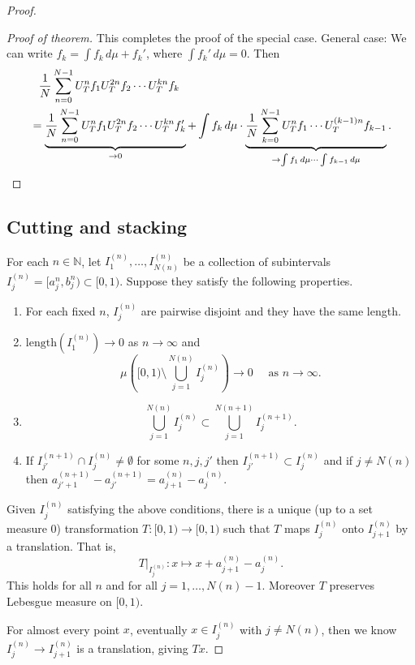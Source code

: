 \documentclass{article}
\begin{document}
\begin{proof}
\begin{proof}[Proof of theorem]
  This completes the proof of the special case.
  General case: We can write $f_k = \int f_k \, d\mu + f_k'$, where $\int f_k' \, d\mu = 0$.
  Then
  \begin{align*}
    &\phantom{=}\frac{1}{N} \sum_{n=0}^{N-1} U_T^n f_1 U_T^{2n} f_2 \dotsm U_T^{kn} f_k  \\
    &= \underbrace{\frac{1}{N} \sum_{n=0}^{N-1} U_T^n f_1 U_T^{2n} f_2 \dotsm U_T^{kn} f_k'}_{\to 0} + \int f_k \, d\mu \cdot \underbrace{\frac{1}{N} \sum_{k=0}^{N-1} U_T^n f_1 \dotsm U_T^{(k-1)n} f_{k-1}}_{\to \int f_1 \, d\mu \dotsm \int f_{k-1} \, d\mu}. \qedhere
  \end{align*}
\end{proof}

\subsection{Cutting and stacking}
For each $n \in \mathbb{N}$, let $I_1^{(n)}, \dotsc, I_{N(n)}^{(n)}$ be a collection of subintervals $I_j^{(n)} = [a_j^{n}, b_j^{n}) \subset [0,1)$. %
Suppose they satisfy the following properties.
\begin{enumerate}[label=(\arabic*)]
  \item For each fixed $n$, $I_j^{(n)}$ are pairwise disjoint and they have the same length.
  \item $\text{length}(I_1^{(n)}) \to 0$ as $n \to \infty$ and
    \begin{equation*}
        \mu\left([0,1) \setminus \bigcup_{j=1}^{N(n)} I_j^{(n)}\right) \to 0 \quad \text{ as } n \to \infty.
    \end{equation*}
  \item
    \begin{equation*}\bigcup_{j = 1}^{N(n)} I_j^{(n)} \subset \bigcup_{j=1}^{N(n+1)} I_j^{(n+1)}.\end{equation*}
  \item If $I_{j'}^{(n+1)} \cap I_j^{(n)} \neq \emptyset$ for some $n,j,j'$ then $I_{j'}^{(n+1)} \subset I_j^{(n)}$ and if $j \neq N(n)$ then $a_{j'+1}^{(n+1)} - a_{j'}^{(n+1)} = a_{j+1}^{(n)} - a_j^{(n)}$.
\end{enumerate}
\begin{lemma}
  Given $I_j^{(n)}$ satisfying the above conditions, there is a unique (up to a set measure 0) transformation $T: [0,1) \to [0, 1)$ such that $T$ maps $I_j^{(n)}$ onto $I_{j+1}^{(n)}$ by a translation.%
  That is,
  \begin{equation*}
    T|_{I_j^{(n)}}:  x \mapsto x + a_{j+1}^{(n)} - a_j^{(n)}.
  \end{equation*}
  This holds for all $n$ and for all $j = 1, \dotsc, N(n)-1$.
  Moreover $T$ preserves Lebesgue measure on $[0,1)$. %
\end{lemma}
For almost every point $x$, eventually $x \in I_j^{(n)}$ with $j \neq N(n)$, then we know $I_j^{(n)} \to I_{j+1}^{(n)}$ is a translation, giving $Tx$.


\end{proof}
\end{document}
